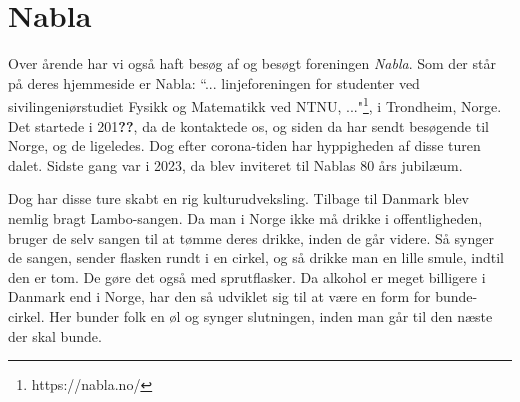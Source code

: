 \chapter{Nabla}
Over årende har vi også haft besøg af og besøgt foreningen \textit{Nabla}. Som der står på deres hjemmeside er Nabla: ``... linjeforeningen for studenter ved sivilingeniørstudiet Fysikk og Matematikk ved NTNU, ..."\footnote{https://nabla.no/}, i Trondheim, Norge. Det startede i 201\textbf{??}, da de kontaktede os, og siden da har \TKET sendt besøgende til Norge, og de ligeledes. Dog efter corona-tiden har hyppigheden af disse turen dalet. Sidste gang var i 2023, da \TKET blev inviteret til Nablas 80 års jubilæum.

Dog har disse ture skabt en rig kulturudveksling. Tilbage til Danmark blev nemlig bragt Lambo-sangen. Da man i Norge ikke må drikke i offentligheden, bruger de selv sangen til at tømme deres drikke, inden de går videre. Så synger de sangen, sender flasken rundt i en cirkel, og så drikke man en lille smule, indtil den er tom. De gøre det også med sprutflasker. Da alkohol er meget billigere i Danmark end i Norge, har den så udviklet sig til at være en form for bunde-cirkel. Her bunder folk en øl og synger slutningen, inden man går til den næste der skal bunde. 